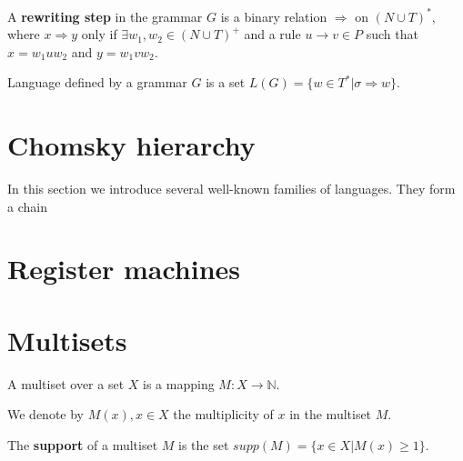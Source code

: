 \begin{definition}
A {\bf rewriting step} in the grammar $G$ is a binary relation $\Rightarrow$ on $(N\cup T)^*$, where $x\Rightarrow y$ only if $\exists w_1, w_2\in (N\cup T)^+$ and a rule $u\rightarrow v \in P$ such that $x=w_1uw_2$ and $y=w_1vw_2$.
\end{definition}

\begin{definition}
Language defined by a grammar $G$ is a set $L(G)=\{w\in T^*|\sigma\Rightarrow w\}$.
\end{definition}


\section{Chomsky hierarchy} %
\label{sec:chomsky_hierarchy}

In this section we introduce several well-known families of languages. They form a chain 



\section{Register machines} %
\label{sec:register_machines}





\section{Multisets} %
\label{sec:multisets}

\begin{definition}
A multiset over a set $X$ is a mapping $M: X\rightarrow \mathbb N$.
\end{definition}

We denote by $M(x), x\in X$ the multiplicity of $x$ in the multiset $M$.

\begin{definition}
The {\bf support} of a multiset $M$ is the set $supp(M)=\{x\in X|M(x)\geq 1\}$.
\end{definition}

